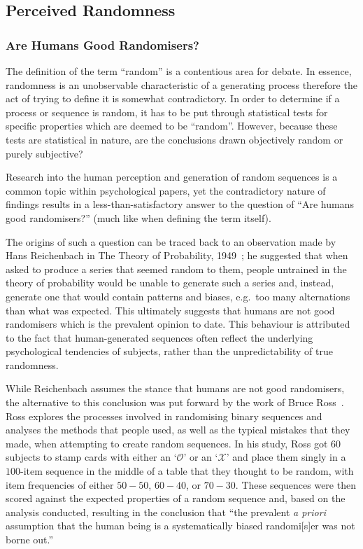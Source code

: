 \subsection{Perceived Randomness}
\subsubsection{Are Humans Good Randomisers?}
The definition of the term ``random'' is a contentious area for debate. In essence, randomness is an unobservable characteristic of a generating process therefore the act of trying to define it is somewhat contradictory. In order to determine if a process or sequence is random, it has to be put through statistical tests for specific properties which are deemed to be ``random''. However, because these tests are statistical in nature, are the conclusions drawn objectively random or purely subjective?

Research into the human perception and generation of random sequences is a common topic within psychological papers, yet the contradictory nature of findings results in a less-than-satisfactory answer to the question of ``Are humans good randomisers?'' (much like when defining the term itself).

The origins of such a question can be traced back to an observation made by Hans Reichenbach in The Theory of Probability, 1949~\cite{reichenbach:1949}; he suggested that when asked to produce a series that seemed random to them, people untrained in the theory of probability would be unable to generate such a series and, instead, generate one that would contain patterns and biases, e.g.\ too many alternations than what was expected. This ultimately suggests that humans are not good randomisers which is the prevalent opinion to date. This behaviour is attributed to the fact that human-generated sequences often reflect the underlying psychological tendencies of subjects, rather than the unpredictability of true randomness.

While Reichenbach assumes the stance that humans are not good randomisers, the alternative to this conclusion was put forward by the work of Bruce Ross~\cite{ross:1955}. Ross explores the processes involved in randomising binary sequences and analyses the methods that people used, as well as the typical mistakes that they made, when attempting to create random sequences. In his study, Ross got 60 subjects to stamp cards with either an `$\mathcal{O}$' or an `$\mathcal{X}$' and  place them singly in a $100$-item sequence in the middle of a table that they thought to be random, with item frequencies of either $50-50$, $60-40$, or $70-30$. These sequences were then scored against the expected properties of a random sequence and, based on the analysis conducted, resulting in the conclusion that ``the prevalent \textit{a priori} assumption that the human being is a systematically biased randomi[s]er was not borne out.''~\cite{ross:1955}

